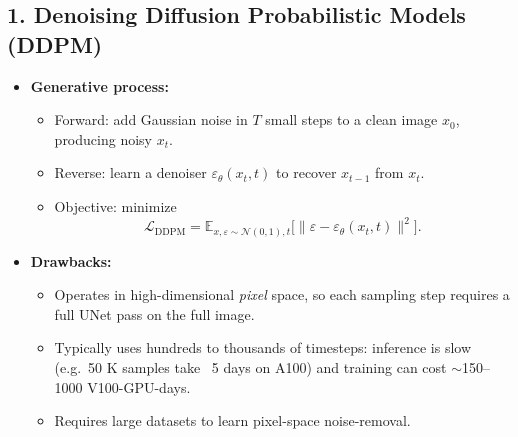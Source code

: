 \subsection*{1. Denoising Diffusion Probabilistic Models (DDPM)}
\begin{itemize}
  \item \textbf{Generative process:}  
    \begin{itemize}
      \item Forward: add Gaussian noise in $T$ small steps to a clean image $x_0$, producing noisy $x_t$.  
      \item Reverse: learn a denoiser $\varepsilon_\theta(x_t,t)$ to recover $x_{t-1}$ from $x_t$.  
      \item Objective: minimize 
        \[
          \mathcal{L}_{\text{DDPM}} = \mathbb{E}_{x,\varepsilon\sim\mathcal{N}(0,1),t}\bigl[\|\varepsilon - \varepsilon_\theta(x_t,t)\|^2\bigr].
        \]
    \end{itemize}
  \item \textbf{Drawbacks:}
    \begin{itemize}
      \item Operates in high-dimensional \emph{pixel} space, so each sampling step requires a full UNet pass on the full image.
      \item Typically uses hundreds to thousands of timesteps: inference is slow (e.g.\ 50 K samples take ~5 days on A100) and training can cost \(\sim\)150–1000 V100-GPU-days.
      \item Requires large datasets to learn pixel-space noise-removal.
    \end{itemize}
\end{itemize}

